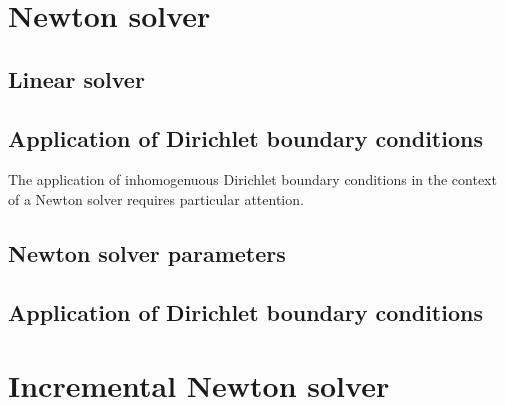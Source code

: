 \section{Newton solver}

\subsection{Linear solver}

\subsection{Application of Dirichlet boundary conditions}

The application of inhomogenuous Dirichlet boundary conditions in the context
of a Newton solver requires particular attention.



\subsection{Newton solver parameters}

\subsection{Application of Dirichlet boundary conditions}


\section{Incremental Newton solver}

